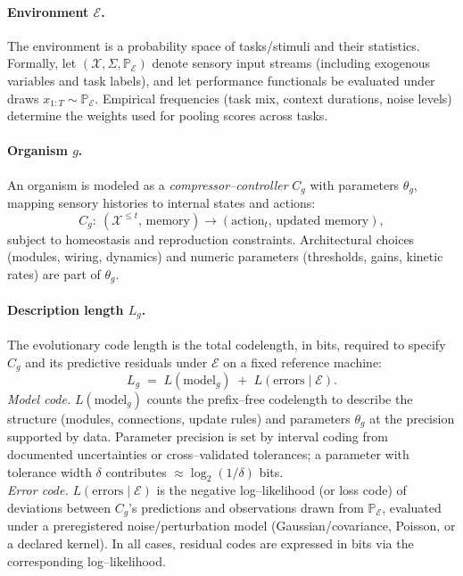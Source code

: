\documentclass[11pt,a4paper]{article}
\begin{document}
\paragraph{Environment $\mathcal{E}$.}
The environment is a probability space of tasks/stimuli and their statistics. Formally, let $(\mathcal{X},\Sigma,\mathbb{P}_{\mathcal{E}})$ denote sensory input streams (including exogenous variables and task labels), and let performance functionals be evaluated under draws $x_{1:T}\sim\mathbb{P}_{\mathcal{E}}$. Empirical frequencies (task mix, context durations, noise levels) determine the weights used for pooling scores across tasks.

\paragraph{Organism $g$.}
An organism is modeled as a \emph{compressor–controller} $C_g$ with parameters $\theta_g$, mapping sensory histories to internal states and actions:
\[
C_g:\ (\mathcal{X}^{\le t},\, \text{memory}) \longrightarrow (\text{action}_t,\, \text{updated memory}),
\]
subject to homeostasis and reproduction constraints. Architectural choices (modules, wiring, dynamics) and numeric parameters (thresholds, gains, kinetic rates) are part of $\theta_g$.

\paragraph{Description length $L_g$.}
The evolutionary code length is the total codelength, in bits, required to specify $C_g$ and its predictive residuals under $\mathcal{E}$ on a fixed reference machine:
\begin{equation}\label{eq:Lg_def}
L_g \;=\; L(\text{model}_g)\;+\;L(\text{errors}\mid \mathcal{E}).
\end{equation}
\emph{Model code.} $L(\text{model}_g)$ counts the prefix–free codelength to describe the structure (modules, connections, update rules) and parameters $\theta_g$ at the precision supported by data. Parameter precision is set by interval coding from documented uncertainties or cross–validated tolerances; a parameter with tolerance width $\delta$ contributes $\approx \log_2(1/\delta)$ bits.\\
\emph{Error code.} $L(\text{errors}\mid \mathcal{E})$ is the negative log–likelihood (or loss code) of deviations between $C_g$’s predictions and observations drawn from $\mathbb{P}_{\mathcal{E}}$, evaluated under a preregistered noise/perturbation model (Gaussian/covariance, Poisson, or a declared kernel). In all cases, residual codes are expressed in bits via the corresponding log–likelihood.
\end{document}
